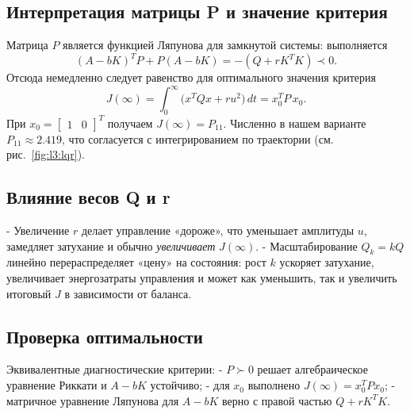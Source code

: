 \subsection{Интерпретация матрицы P и значение критерия}
Матрица \(P\) является функцией Ляпунова для замкнутой системы: выполняется
\[
(A-bK)^T P + P (A-bK) = -(Q + r K^T K)\prec0.
\]
Отсюда немедленно следует равенство для оптимального значения критерия
\[
 J(\infty)=\int_{0}^{\infty} \big(x^T Q x + r u^2\big)\,dt = x_0^T P\,x_0.
\]
При \(x_0=\begin{bmatrix}1&0\end{bmatrix}^T\) получаем \(J(\infty)=P_{11}\). Численно в нашем варианте \(P_{11}\approx 2{.}419\), что согласуется с интегрированием по траектории (см. рис.~\ref{fig:l3:lqr}).

\subsection{Влияние весов Q и r}
- Увеличение \(r\) делает управление «дороже», что уменьшает амплитуды \(u\), замедляет затухание и обычно \emph{увеличивает} \(J(\infty)\).
- Масштабирование \(Q_k=kQ\) линейно перераспределяет «цену» на состояния: рост \(k\) ускоряет затухание, увеличивает энергозатраты управления и может как уменьшить, так и увеличить итоговый \(J\) в зависимости от баланса.

\subsection{Проверка оптимальности}
Эквивалентные диагностические критерии:
- \(P\succ0\) решает алгебраическое уравнение Риккати и \(A-bK\) устойчиво;
- для \(x_0\) выполнено \(J(\infty)=x_0^T P x_0\);
- матричное уравнение Ляпунова для \(A-bK\) верно с правой частью \(Q+rK^T K\).
